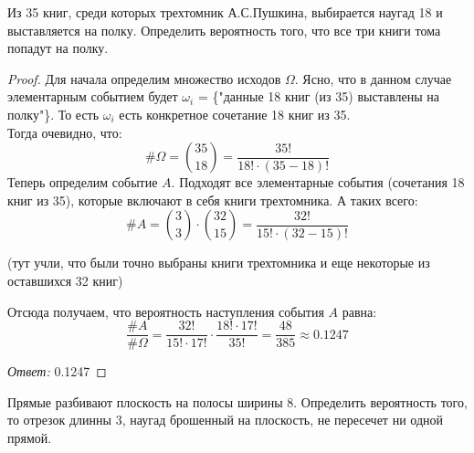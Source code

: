 
\renewcommand*{\proofname}{Решение}

\begin{problem}
Из 35 книг, среди которых трехтомник А.С.Пушкина, выбирается наугад 18 и выставляется на полку. Определить вероятность того, что все три книги тома попадут на полку.\\
\end{problem}

\begin{proof}
Для начала определим множество исходов $\Omega$. Ясно, что в данном случае элементарным событием будет $ \omega_i $ = \{"данные 18 книг (из 35) выставлены на полку"\}. То есть $ \omega_i $ есть конкретное сочетание 18 книг из 35.\\Тогда очевидно, что:
\[ \#\Omega = \binom{35}{18} = \frac{35!}{18!\cdot\left(35-18\right)!} \]
Теперь определим событие $ A $. Подходят все элементарные события (сочетания 18 книг из 35), которые включают в себя книги трехтомника. А таких всего:
\[  \#A = \binom{3}{3}\cdot\binom{32}{15} = \frac{32!}{15!\cdot\left(32-15\right)!} \]

(тут учли, что были точно выбраны книги трехтомника и еще некоторые из оставшихся 32 книг)

Отсюда получаем, что вероятность наступления события $ A $ равна:
\[\frac{\#A}{\#\Omega} = \frac{32!}{15!\cdot17!}\cdot\frac{18!\cdot17!}{35!} = \frac{48}{385} \approx 0.1247 \]

{\it Ответ:} 0.1247
\end{proof}

\begin{problem}
Прямые разбивают плоскость на полосы ширины 8. Определить вероятность того, то отрезок длинны 3, наугад брошенный на плоскость, не пересечет ни одной прямой.\\
\end{problem}

